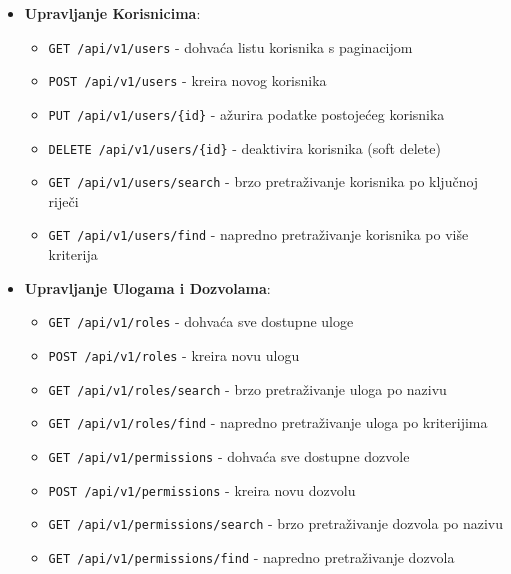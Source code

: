 \documentclass[a4paper,12pt]{article}
\begin{document}
\begin{itemize}
    \item \textbf{Upravljanje Korisnicima}:
        \begin{itemize}
            \item \texttt{GET /api/v1/users} - dohvaća listu korisnika s paginacijom
            \item \texttt{POST /api/v1/users} - kreira novog korisnika
            \item \texttt{PUT /api/v1/users/\{id\}} - ažurira podatke postojećeg korisnika
            \item \texttt{DELETE /api/v1/users/\{id\}} - deaktivira korisnika (soft delete)
            \item \texttt{GET /api/v1/users/search} - brzo pretraživanje korisnika po ključnoj riječi
            \item \texttt{GET /api/v1/users/find} - napredno pretraživanje korisnika po više kriterija
        \end{itemize}

    \item \textbf{Upravljanje Ulogama i Dozvolama}:
        \begin{itemize}
            \item \texttt{GET /api/v1/roles} - dohvaća sve dostupne uloge
            \item \texttt{POST /api/v1/roles} - kreira novu ulogu
            \item \texttt{GET /api/v1/roles/search} - brzo pretraživanje uloga po nazivu
            \item \texttt{GET /api/v1/roles/find} - napredno pretraživanje uloga po kriterijima
            \item \texttt{GET /api/v1/permissions} - dohvaća sve dostupne dozvole
            \item \texttt{POST /api/v1/permissions} - kreira novu dozvolu
            \item \texttt{GET /api/v1/permissions/search} - brzo pretraživanje dozvola po nazivu
            \item \texttt{GET /api/v1/permissions/find} - napredno pretraživanje dozvola
        \end{itemize}
    

\end{itemize}
\end{document}
